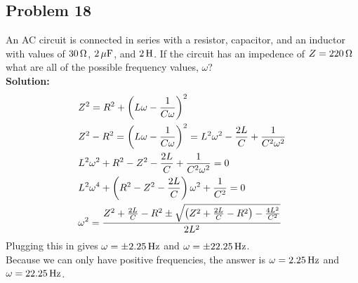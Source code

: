 \subsection*{Problem 18}
An AC circuit is connected in series with a resistor, capacitor, and an inductor with values of $30\,\mathrm{\Omega}$, $2\,\mathrm{\mu F}$, and $2\,\mathrm{H}$. If the circuit has an impedence of $Z=220\,\mathrm{\Omega}$ what are all of the possible frequency values, $\omega$?\\

\textbf{Solution:}
\begin{align*}
    &Z^2=R^2+\left( L\omega-\frac{1}{C\omega} \right)^2\\
    &Z^2-R^2=\left( L\omega-\frac{1}{C\omega} \right)^2=L^2\omega^2-\frac{2L}{C}+\frac{1}{C^2\omega^2}\\
    &L^2\omega^2+R^2-Z^2-\frac{2L}{C}+\frac{1}{C^2\omega^2}=0\\
    &L^2\omega^4+\left( R^2-Z^2-\frac{2L}{C} \right)\omega^2+\frac{1}{C^2}=0\\
    &\omega^2=\frac{Z^2+\frac{2L}{C}-R^2\pm\sqrt{\left( Z^2+\frac{2L}{C}-R^2 \right)-\frac{4L^2}{C^2}}}{2L^2}
\end{align*}
Plugging this in gives $\omega = \pm2.25\,\mathrm{Hz}$ and $\omega=\pm22.25\,\mathrm{Hz}$.\\
Because we can only have positive frequencies, the answer is $\omega=2.25\,\mathrm{Hz}$ and $\omega=22.25\,\mathrm{Hz}$.
